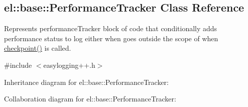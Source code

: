 \hypertarget{a00065}{}\subsection{el\+:\+:base\+:\+:Performance\+Tracker Class Reference}
\label{a00065}


Represents performance\+Tracker block of code that conditionally adds performance status to log either when goes outside the scope of when \hyperlink{a00065_aec9a6e149674c5782cc855e49aeb0aaf}{checkpoint()} is called.  




{\ttfamily \#include $<$easylogging++.\+h$>$}



Inheritance diagram for el\+:\+:base\+:\+:Performance\+Tracker\+:


Collaboration diagram for el\+:\+:base\+:\+:Performance\+Tracker\+:
